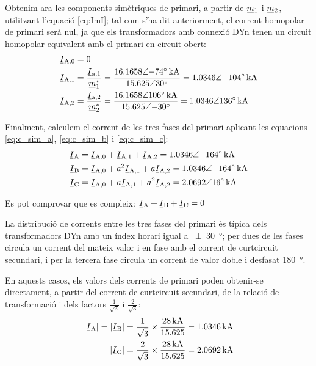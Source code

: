 \begin{exemple}[\CCasimSecTrafo{}]
    Obtenim ara les components simètriques de primari, a partir de $\cmplx{m}_1$ i $\cmplx{m}_2$, utilitzant l'equació \eqref{eq:ImI}; tal com s'ha dit anteriorment, el corrent homopolar de primari serà nul, ja que els transformadors amb connexió DYn tenen un circuit homopolar equivalent amb el primari en circuit obert:
    \begin{align*}
        \cmplx{I}\ped{A,0} &= 0 \\
        \cmplx{I}\ped{A,1} &= \frac{\cmplx{I}\ped{a,1}}{\cmplx{m}^*_1} = \frac{\complexqty{16,1658:-74}{kA}}{\complexnum{15,625:30}} =  \complexqty{1,0346:-104}{kA} \\
        \cmplx{I}\ped{A,2} &= \frac{\cmplx{I}\ped{a,2}}{\cmplx{m}^*_2} = \frac{\complexqty{16,1658:106}{kA}}{\complexnum{15,625:-30}} = \complexqty{1,0346:136}{kA}
    \end{align*}

    Finalment, calculem el corrent de les tres fases del primari aplicant les equacions \eqref{eq:c_sim_a}, \eqref{eq:c_sim_b} i \eqref{eq:c_sim_c}:
     \begin{align*}
        \cmplx{I}\ped{A} &= \cmplx{I}\ped{A,0} + \cmplx{I}\ped{A,1} + \cmplx{I}\ped{A,2} = \complexqty{1,0346:-164}{kA} \\
        \cmplx{I}\ped{B} &= \cmplx{I}\ped{A,0} + a^2 \cmplx{I}\ped{A,1} + a \cmplx{I}\ped{A,2} = \complexqty{1,0346:-164}{kA} \\
        \cmplx{I}\ped{C} &= \cmplx{I}\ped{A,0} + a \cmplx{I}\ped{A,1} + a^2 \cmplx{I}\ped{A,2} = \complexqty{2,0692:16}{kA}
    \end{align*}

    Es pot comprovar que es compleix: $\cmplx{I}\ped{A} + \cmplx{I}\ped{B} + \cmplx{I}\ped{C} = 0$

    La distribució de corrents entre les tres fases del primari és típica dels transformadors DYn amb un índex horari igual a \qty{+-30}{\degree}; per dues de les fases circula un corrent del mateix valor i en fase amb el corrent de curtcircuit secundari, i per la tercera fase circula un corrent de valor doble i desfasat \qty{180}{\degree}.

    En aquests casos, els valors dels corrents de primari poden obtenir-se directament, a partir del corrent de curtcircuit secundari, de la relació de transformació i dels factors $\frac{1}{\sqrt{3}}$ i  $\frac{2}{\sqrt{3}}$:
    \begin{align*}
        |\cmplx{I}\ped{A}| = |\cmplx{I}\ped{B}| = \frac{1}{\sqrt{3}} \times \frac{\qty{28}{kA}}{\num{15,625}} = \qty{1,0346}{kA} \\
        |\cmplx{I}\ped{C}|= \frac{2}{\sqrt{3}} \times \frac{\qty{28}{kA}}{\num{15,625}} = \qty{2,0692}{kA}
    \end{align*}



\end{exemple}
